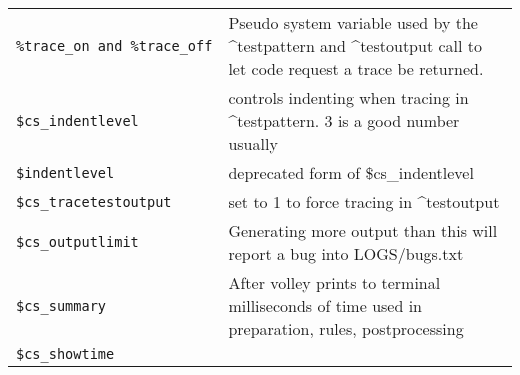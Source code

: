\documentclass[]{article}
\begin{document}
\begin{longtable}[]{@{}ll@{}}
\begin{minipage}[t]{0.26\columnwidth}
\texttt{\%trace\_on\ and\ \%trace\_off}\strut
\end{minipage} & \begin{minipage}[t]{0.10\columnwidth}\raggedright\strut
Pseudo system variable used by the \^{}testpattern and \^{}testoutput
call to let code request a trace be returned.\strut
\end{minipage}\tabularnewline
\begin{minipage}[t]{0.26\columnwidth}\raggedright\strut
\texttt{\$cs\_indentlevel}\strut
\end{minipage} & \begin{minipage}[t]{0.10\columnwidth}\raggedright\strut
controls indenting when tracing in \^{}testpattern. 3 is a good number
usually\strut
\end{minipage}\tabularnewline
\begin{minipage}[t]{0.26\columnwidth}\raggedright\strut
\texttt{\$indentlevel}\strut
\end{minipage} & \begin{minipage}[t]{0.10\columnwidth}\raggedright\strut
deprecated form of \$cs\_indentlevel\strut
\end{minipage}\tabularnewline
\begin{minipage}[t]{0.26\columnwidth}\raggedright\strut
\texttt{\$cs\_tracetestoutput}\strut
\end{minipage} & \begin{minipage}[t]{0.10\columnwidth}\raggedright\strut
set to 1 to force tracing in \^{}testoutput\strut
\end{minipage}\tabularnewline
\begin{minipage}[t]{0.26\columnwidth}\raggedright\strut
\texttt{\$cs\_outputlimit}\strut
\end{minipage} & \begin{minipage}[t]{0.10\columnwidth}\raggedright\strut
Generating more output than this will report a bug into
LOGS/bugs.txt\strut
\end{minipage}\tabularnewline
\begin{minipage}[t]{0.26\columnwidth}\raggedright\strut
\texttt{\$cs\_summary}\strut
\end{minipage} & \begin{minipage}[t]{0.10\columnwidth}\raggedright\strut
After volley prints to terminal milliseconds of time used in
preparation, rules, postprocessing\strut
\end{minipage}\tabularnewline
\begin{minipage}[t]{0.26\columnwidth}\raggedright\strut
\texttt{\$cs\_showtime}\strut

\end{minipage}
\end{longtable}
\end{document}
